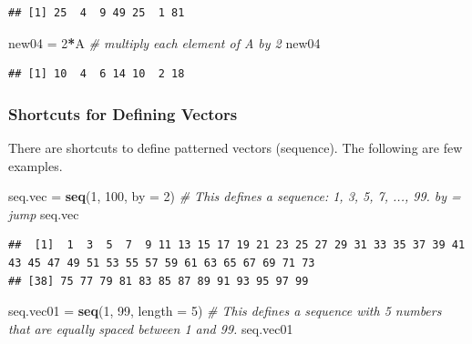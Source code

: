 \documentclass[
]{book}
\newenvironment{Shaded}{\begin{snugshade}}{\end{snugshade}}
\newcommand{\AttributeTok}[1]{\textcolor[rgb]{0.13,0.29,0.53}{#1}}
\newcommand{\CommentTok}[1]{\textcolor[rgb]{0.56,0.35,0.01}{\textit{#1}}}
\newcommand{\DecValTok}[1]{\textcolor[rgb]{0.00,0.00,0.81}{#1}}
\newcommand{\FunctionTok}[1]{\textcolor[rgb]{0.13,0.29,0.53}{\textbf{#1}}}
\newcommand{\NormalTok}[1]{#1}
\newcommand{\OtherTok}[1]{\textcolor[rgb]{0.56,0.35,0.01}{#1}}
\newcommand{\SpecialCharTok}[1]{\textcolor[rgb]{0.81,0.36,0.00}{\textbf{#1}}}
\begin{document}
\begin{verbatim}
## [1] 25  4  9 49 25  1 81
\end{verbatim}

\begin{Shaded}
\begin{Highlighting}[]
\NormalTok{new04 }\OtherTok{=} \DecValTok{2}\SpecialCharTok{*}\NormalTok{A       }\CommentTok{\# multiply each element of A by 2}
\NormalTok{new04}
\end{Highlighting}
\end{Shaded}

\begin{verbatim}
## [1] 10  4  6 14 10  2 18
\end{verbatim}

\hypertarget{shortcuts-for-defining-vectors}{%
\subsubsection{Shortcuts for Defining Vectors}\label{shortcuts-for-defining-vectors}}

There are shortcuts to define patterned vectors (sequence). The following are few examples.

\begin{Shaded}
\begin{Highlighting}[]
\NormalTok{seq.vec }\OtherTok{=} \FunctionTok{seq}\NormalTok{(}\DecValTok{1}\NormalTok{, }\DecValTok{100}\NormalTok{, }\AttributeTok{by =} \DecValTok{2}\NormalTok{)       }\CommentTok{\# This defines a sequence: 1, 3, 5, 7, ..., 99. by = jump}
\NormalTok{seq.vec}
\end{Highlighting}
\end{Shaded}

\begin{verbatim}
##  [1]  1  3  5  7  9 11 13 15 17 19 21 23 25 27 29 31 33 35 37 39 41 43 45 47 49 51 53 55 57 59 61 63 65 67 69 71 73
## [38] 75 77 79 81 83 85 87 89 91 93 95 97 99
\end{verbatim}

\begin{Shaded}
\begin{Highlighting}[]
\NormalTok{seq.vec01 }\OtherTok{=} \FunctionTok{seq}\NormalTok{(}\DecValTok{1}\NormalTok{, }\DecValTok{99}\NormalTok{, }\AttributeTok{length =} \DecValTok{5}\NormalTok{)  }\CommentTok{\# This defines a sequence with 5 numbers that are equally spaced between 1 and 99.}
\NormalTok{seq.vec01}
\end{Highlighting}
\end{Shaded}
\end{document}
